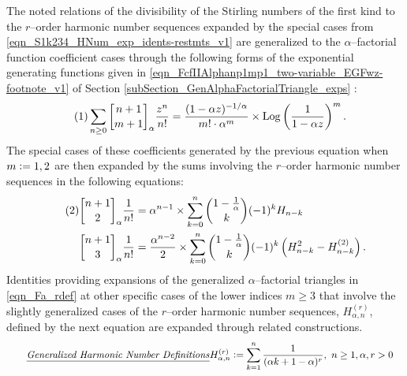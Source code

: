 \documentclass[12pt,reqno]{article}
\numberwithin{sfootnote}{section}
\numberwithin{equation}{section}
\newcommand{\tagonce}[0]{
     \addtocounter{equation}{1}
     \tag{\theequation}
}
\newcommand{\tagtext}[1]{\tag*{\underline{\textit{#1}}}}
\theoremstyle{DefaultTheoremStyle}
\theoremstyle{definition}
\newcommand{\cf}[0]{cf.\ }
\newcommand{\defequals}{\ensuremath{\vcentcolon=}}
\newcommand{\gkpSI}[2]{\ensuremath{\genfrac{\lbrack}{\rbrack}{0pt}{}{#1}{#2}}}
\newcommand{\FcfII}[3]{\ensuremath{\gkpSI{#2}{#3}_{#1}}}
\newcommand{\Pochhammer}[2]{\ensuremath{\left(#1\right)_{#2}}}
\DeclareMathOperator{\Log}{Log}
\begin{document}
The noted relations of the divisibility of the 
Stirling numbers of the first kind to the 
$r$--order harmonic number sequences expanded by the special cases from 
\eqref{eqn_S1k234_HNum_exp_idents-restmts_v1} 
are generalized to the $\alpha$--factorial function coefficient 
cases through the following forms of the 
exponential generating functions given in 
\eqref{eqn_FcfIIAlphanp1mp1_two-variable_EGFwz-footnote_v1} of 
Section \ref{subSection_GenAlphaFactorialTriangle_exps} 
\citep[\cf \S 3.3]{MULTIFACTJIS}: 
\begin{align*} 
\tagonce\label{eqn_FcfIIAlphanp1mp1_two-variable_EGFwz} 
\sum_{n \geq 0} \FcfII{\alpha}{n+1}{m+1} \frac{z^n}{n!} & = 
          \frac{(1- \alpha z)^{-1 / \alpha}}{m! \cdot \alpha^{m}} \times 
          \Log\left(\frac{1}{1-\alpha z}\right)^{m}. 
\end{align*} 
The special cases of these coefficients generated by the 
previous equation when $m \defequals 1,2$ are then expanded by the 
sums involving the $r$--order harmonic number sequences in the 
following equations: 
\begin{align*} 
\tagonce\label{eqn_FcfAlphaGenCoeffs_HNumExpIdents-stmts_v1} 
\FcfII{\alpha}{n+1}{2} \frac{1}{n!} & = 
     \alpha^{n-1} \times \sum_{k=0}^{n} 
     \binom{1-\frac{1}{\alpha}}{k} (-1)^{k} H_{n-k} \\ 
\FcfII{\alpha}{n+1}{3} \frac{1}{n!} & = 
     \frac{\alpha^{n-2}}{2} \times \sum_{k=0}^{n} 
     \binom{1-\frac{1}{\alpha}}{k} (-1)^{k} \left( 
     H_{n-k}^2 - H_{n-k}^{(2)} 
     \right). 
\end{align*} 
Identities providing expansions of the 
generalized $\alpha$--factorial triangles in \eqref{eqn_Fa_rdef} 
at other specific cases of the lower indices $m \geq 3$ 
that involve the slightly generalized cases of the 
$r$--order harmonic number sequences, $H_{\alpha,n}^{(r)}$, 
defined by the next equation 
are expanded through related constructions. 
\begin{align*} 
\tagtext{Generalized Harmonic Number Definitions} 
H_{\alpha,n}^{(r)} & \defequals 
     \sum_{k=1}^{n} \frac{1}{(\alpha k+1-\alpha)^{r}},\ 
     n \geq 1, \alpha, r > 0 
\end{align*} 
\end{document}
